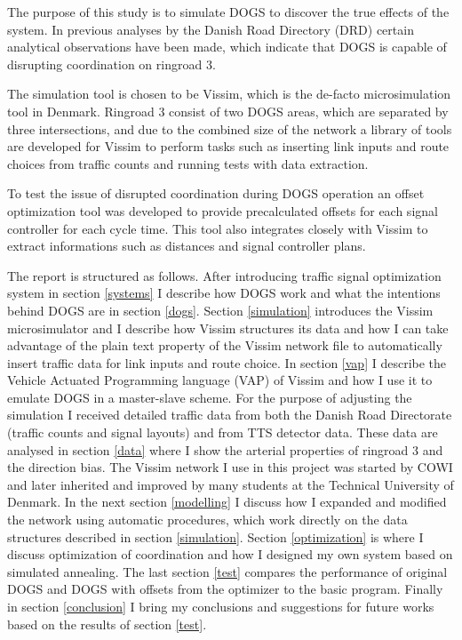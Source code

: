 The purpose of this study is to simulate DOGS to discover the true effects of the system. In previous analyses by the Danish Road Directory (DRD) certain analytical observations have been made, which indicate that DOGS is capable of disrupting coordination on ringroad 3.

The simulation tool is chosen to be Vissim, which is the de-facto microsimulation tool in Denmark. Ringroad 3 consist of two DOGS areas, which are separated by three intersections, and due to the combined size of the network a library of tools are developed for Vissim to perform tasks such as inserting link inputs and route choices from traffic counts and running tests with data extraction.

To test the issue of disrupted coordination during DOGS operation an offset optimization tool was developed to provide precalculated offsets for each signal controller for each cycle time. This tool also integrates closely with Vissim to extract informations such as distances and signal controller plans. 

The report is structured as follows. After introducing traffic signal optimization system in section \ref{systems} I describe how DOGS work and what the intentions behind DOGS are in section \ref{dogs}. Section \ref{simulation} introduces the Vissim microsimulator and I describe how Vissim structures its data and how I can take advantage of the plain text property of the Vissim network file to automatically insert traffic data for link inputs and route choice. In section \ref{vap} I describe the Vehicle Actuated Programming language (VAP) of Vissim and how I use it to emulate DOGS in a master-slave scheme. For the purpose of adjusting the simulation I received detailed traffic data from both the Danish Road Directorate (traffic counts and signal layouts) and from TTS detector data. These data are analysed in section \ref{data} where I show the arterial properties of ringroad 3 and the direction bias. The Vissim network I use in this project was started by COWI and later inherited and improved by many students at the Technical University of Denmark. In the next section \ref{modelling} I discuss how I expanded and modified the network using automatic procedures, which work directly on the data structures described in section \ref{simulation}. Section \ref{optimization} is where I discuss optimization of coordination and how I designed my own system based on simulated annealing. The last section \ref{test} compares the performance of original DOGS and DOGS with offsets from the optimizer to the basic program. Finally in section \ref{conclusion} I bring my conclusions and suggestions for future works based on the results of section \ref{test}.

